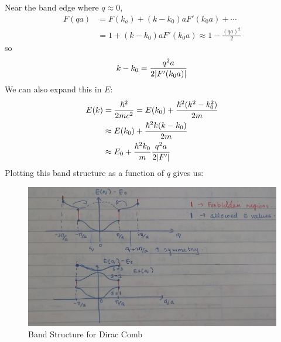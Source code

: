 \documentclass[a4paper,twoside,master.tex]{subfiles}
\begin{document}
\begin{ex}
    Near the band edge where $ q \approx 0 $,
    \begin{align}
        F(qa) &= F(k_a) + (k-k_0) a F'(k_0a) + \cdots\\
        &= 1 + (k-k_0) a F'(k_0 a) \approx 1 - \frac{(qa)^2}{2}
    \end{align}
    so
    \begin{equation}
        k-k_0 = \frac{q^2 a}{2 \abs{F'(k_0a)}}
    \end{equation}
    We can also expand this in $ E $:
    \begin{align}
        E(k) &= \frac{\hbar^2}{2m c^2} = E(k_0)+ \frac{\hbar^2 (k^2 - k_0^2)}{2m}\\
        &\approx E(k_0) + \frac{\hbar^2 k(k-k_0)}{2m}\\
        &\approx E_0 + \frac{\hbar^2 k_0}{m} \frac{q^2 a}{2 \abs{F'}}
    \end{align}
    Plotting this band structure as a function of $ q $ gives us:
    \begin{figure}[h]
        \centering
        \includegraphics[width=\textwidth/2]{figures/lec_32_band.png}
        \caption{Band Structure for Dirac Comb}
        \label{fig:band_structure_for_dirac_comb}
    \end{figure}
\end{ex}
\end{document}
